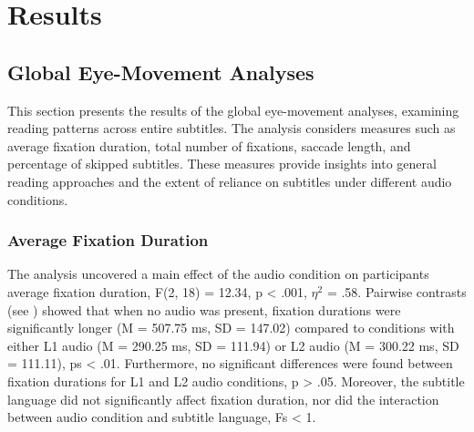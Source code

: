 \section{Results}\label{sec-results}
\subsection{Global Eye-Movement Analyses}\label{sub-sec-globaleyemovementanalysis}

This section presents the results of the global eye-movement analyses, examining reading patterns across entire subtitles. The analysis considers measures such as average fixation duration, total number of fixations, saccade length, and percentage of skipped subtitles. These measures provide insights into general reading approaches and the extent of reliance on subtitles under different audio conditions.

\subsubsection{Average Fixation Duration}\label{sub-sub-sec-averagefixation}

The analysis uncovered a main effect of the audio condition on
participants\textquotesingle{} average fixation duration, F(2, 18) =
12.34, p \textless{} .001, $\eta^2$ = .58. Pairwise contrasts (see )
showed that when no audio was present, fixation durations were
significantly longer (M = 507.75 ms, SD = 147.02) compared to conditions
with either L1 audio (M = 290.25 ms, SD = 111.94) or L2 audio (M =
300.22 ms, SD = 111.11), ps \textless{} .01. Furthermore, no significant
differences were found between fixation durations for L1 and L2 audio
conditions, p \textgreater{} .05. Moreover, the subtitle language did
not significantly affect fixation duration, nor did the interaction
between audio condition and subtitle language, Fs \textless{} 1.

